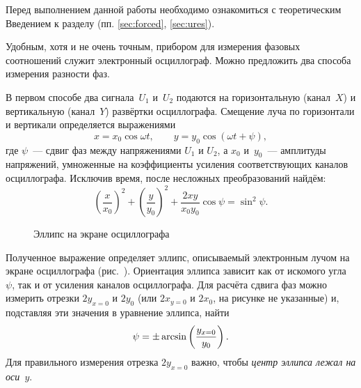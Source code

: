 


Перед выполнением данной работы необходимо ознакомиться с теоретическим
Введением к разделу (пп. \ref{sec:forced}, \ref{sec:ures}).

Удобным, хотя и не очень точным, прибором для измерения фазовых соотношений 
служит электронный осциллограф. Можно предложить два способа измерения разности фаз.

В первом способе два сигнала~$U_1$ и~$U_2$ подаются 
на горизонтальную (канал~$X$) и вертикальную (канал~$Y$) развёртки осциллографа. 
Смещение луча по горизонтали и вертикали определяется выражениями
\begin{equation*}
x=x_0\cos\omega t,\qquad y=y_0\cos(\omega t+\psi),
\end{equation*}
где $\psi$~--- сдвиг фаз между напряжениями $U_1$ и $U_2$, а $x_0$ и~$y_0$~---
амплитуды напряжений, умноженные на
коэффициенты усиления соответствующих каналов осциллографа. Исключив время,
после несложных преобразований найдём:
\begin{equation*}
\left(\frac{x}{x_0}\right)^2+ \left(\frac{y}{y_0}\right)^2+ \frac{2xy}{x_0 y_0}
\cos\psi=\sin^2 \psi.
\end{equation*}

\begin{wrapfigure}[13]{r}{0.45\linewidth}
	\caption{Эллипс на экране осциллографа}
\end{wrapfigure}

Полученное выражение определяет эллипс, описываемый электронным лучом на 
экране осциллографа (рис.~). Ориентация эллипса зависит как от искомого 
угла~$\psi$, так и от усиления каналов осциллографа. Для расчёта сдвига фаз 
можно измерить отрезки $2y_{x=0}$ и $2y_0$ (или $2x_{y=0}$ и $2x_0$, 
на рисунке не указанные) и, подставляя эти значения в уравнение эллипса, найти
\begin{equation}
\eqmark{phasexy}
\psi=\pm\arcsin\left(\frac{y_{x=0}}{y_0}\right).
\end{equation}
Для правильного измерения отрезка $2y_{x=0}$ важно, чтобы 
\emph{центр     эллипса лежал на оси~$y$}.

